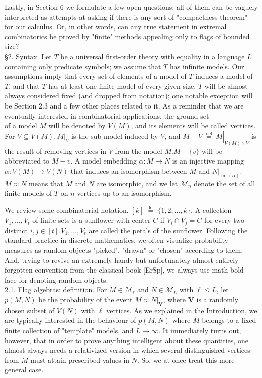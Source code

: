 \documentclass[10pt]{article}
\begin{document}
Lastly, in Section 6 we formulate a few open questions; all of them can be vaguely interpreted as attempts at asking if there is any sort of "compactness theorem" for our calculus. Or, in other words, can any true statement in extremal combinatorics be proved by "finite" methods appealing only to flags of bounded size?\\
§2. Syntax. Let $T$ be a universal first-order theory with equality in a language $L$ containing only predicate symbols; we assume that $T$ has infinite models. Our assumptions imply that every set of elements of a model of $T$ induces a model of $T$, and that $T$ has at least one finite model of every given size. $T$ will be almost always considered fixed (and dropped from notation); one notable exception will be Section 2.3 and a few other places related to it. As a reminder that we are eventually interested in combinatorial applications, the ground set\\
of a model $M$ will be denoted by $V(M)$, and its elements will be called vertices. For $V \subseteq V(M),\left.M\right|_{V}$ is the sub-model induced by $V$, and $M-\left.V \stackrel{\text { def }}{=} M\right|_{V(M) \backslash V}$ is the result of removing vertices in $V$ from the model $M . M-\{v\}$ will be abbreviated to $M-v$. A model embedding $\alpha: M \longrightarrow N$ is an injective mapping $\alpha: V(M) \longrightarrow V(N)$ that induces an isomorphism between $M$ and $\left.N\right|_{\operatorname{im}(\alpha)}$. $M \approx N$ means that $M$ and $N$ are isomorphic, and we let $\mathcal{M}_{n}$ denote the set of all finite models of $T$ on $n$ vertices up to an isomorphism.

We review some combinatorial notation. $[k] \stackrel{\text { def }}{=}\{1,2, \ldots, k\}$. A collection $V_{1}, \ldots, V_{t}$ of finite sets is a sunflower with center $C$ if $V_{i} \cap V_{j}=C$ for every two distinct $i, j \in[t] . V_{1}, \ldots, V_{t}$ are called the petals of the sunflower. Following the standard practice in discrete mathematics, we often visualize probability measures as random objects "picked", "drawn" or "chosen" according to them. And, trying to revive an extremely handy but unfortunately almost entirely forgotten convention from the classical book [ErSp], we always use math bold face for denoting random objects.\\
2.1. Flag algebras: definition. For $M \in \mathcal{M}_{\ell}$ and $N \in \mathcal{M}_{L}$ with $\ell \leq L$, let $p(M, N)$ be the probability of the event $\left.M \approx N\right|_{\boldsymbol{V}}$, where $\boldsymbol{V}$ is a randomly chosen subset of $V(N)$ with $\ell$ vertices. As we explained in the Introduction, we are typically interested in the behaviour of $p(M, N)$ where $M$ belongs to a fixed finite collection of "template" models, and $L \longrightarrow \infty$. It immediately turns out, however, that in order to prove anything intelligent about these quantities, one almost always needs a relativized version in which several distinguished vertices from $M$ must attain prescribed values in $N$. So, we at once treat this more general case.
\end{document}
